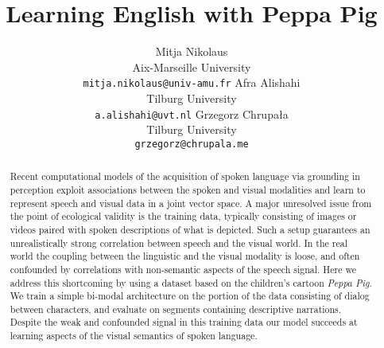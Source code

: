 \documentclass[11pt,a4paper]{article}
\begin{document}
\title{Learning English with Peppa Pig}

\author{Mitja Nikolaus\\
  Aix-Marseille University\\
  \texttt{mitja.nikolaus@univ-amu.fr}
  \And
  Afra Alishahi\\
  Tilburg University\\
  \texttt{a.alishahi@uvt.nl}
  \AND
  Grzegorz Chrupała\\
  Tilburg University\\
  \texttt{grzegorz@chrupala.me}}

\date{}


\maketitle
\begin{abstract}
  Recent computational models of the acquisition of spoken language
  via grounding in perception exploit associations between the spoken
  and visual modalities and learn to represent speech and visual data
  in a joint vector space. A major unresolved issue from the point of
  ecological validity is the training data, typically consisting of
  images or videos paired with spoken descriptions of what is
  depicted. Such a setup guarantees an unrealistically strong
  correlation between speech and the visual world.  In the real world
  the coupling between the linguistic and the visual modality is
  loose, and often confounded by correlations with non-semantic
  aspects of the speech signal. Here we address this shortcoming by
  using a dataset based on the children's cartoon {\it Peppa Pig}.  We
  train a simple bi-modal architecture on the portion of the data
  consisting of dialog between characters, and evaluate on segments
  containing descriptive narrations. Despite the weak and confounded
  signal in this training data our model succeeds at learning aspects
  of the visual semantics of spoken language.
\end{abstract}










%
\end{document}
